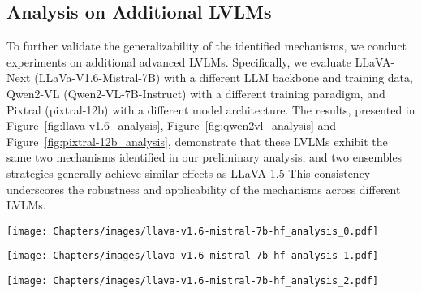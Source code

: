 

\subsection{Analysis on Additional LVLMs}
\label{sec:extra_lvlm}
To further validate the generalizability of the identified mechanisms, we conduct experiments on additional advanced LVLMs. Specifically, we evaluate LLaVA-Next (LLaVa-V1.6-Mistral-7B) with a different LLM backbone and training data, Qwen2-VL (Qwen2-VL-7B-Instruct) with a different training paradigm, and Pixtral (pixtral-12b) with a different model architecture. The results, presented in Figure~\ref{fig:llava-v1.6_analysis}, Figure~\ref{fig:qwen2vl_analysis} and Figure~\ref{fig:pixtral-12b_analysis}, demonstrate that these LVLMs exhibit the same two mechanisms identified in our preliminary analysis, and two ensembles strategies generally achieve similar effects as LLaVA-1.5 
This consistency underscores the robustness and applicability of the mechanisms across different LVLMs.

\begin{figure*}[!h]
    \centering
    \begin{minipage}{0.25\linewidth} 
        \texttt{[image: Chapters/images/llava-v1.6-mistral-7b-hf\_analysis\_0.pdf]}
        \vspace{-6mm}
    \end{minipage}
    \vfill 
    \vspace{10pt}
    \begin{minipage}{\linewidth}
        \texttt{[image: Chapters/images/llava-v1.6-mistral-7b-hf\_analysis\_1.pdf]}
        \vspace{-6mm}
    \end{minipage}
    \vfill
    \vspace{10pt}
    \begin{minipage}{\linewidth}
        \centering
        \texttt{[image: Chapters/images/llava-v1.6-mistral-7b-hf\_analysis\_2.pdf]}
        \vspace{-6mm}
    \end{minipage}
    \caption{\textbf{Analysis on LLaVa-V1.6-Mistral-7B.} Overall, system reminder and model optimization exhibit safety shift while query refactoring exhibits harmfulness discrimination. Inter-mechanism ensembles reinforce the mechanism while intra-mechanism ensembles achieve a better trade-off.}
    \label{fig:llava-v1.6_analysis}
\end{figure*}

